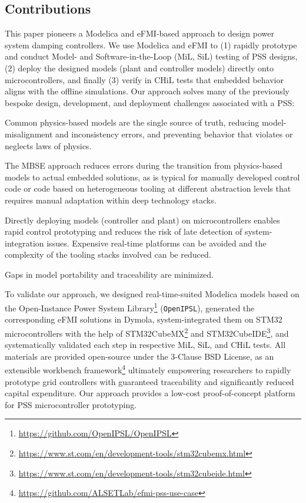 \subsection{Contributions}

This paper pioneers a Modelica and eFMI-based approach to design power system damping controllers. We use Modelica and eFMI to (1) rapidly prototype and conduct Model- and Software-in-the-Loop (MiL, SiL) testing of PSS designs, (2) deploy the designed models (plant and controller models) directly onto microcontrollers, and finally (3) verify in CHiL tests that embedded behavior aligns with the offline simulations. Our approach solves many of the previously bespoke design, development, and deployment challenges associated with a PSS:

\squishlist
    \item Common physics-based models are the single source of truth, reducing model-misalignment and inconsistency errors, and preventing behavior that violates or neglects laws of physics.
    \item The MBSE approach reduces errors during the transition from physics-based models to actual embedded solutions, as is typical for manually developed control code or code based on heterogeneous tooling at different abstraction levels that requires manual adaptation within deep technology stacks.
    \item Directly deploying models (controller and plant) on microcontrollers enables rapid control prototyping and reduces the risk of late detection of system-integration issues. Expensive real-time platforms can be avoided and the complexity of the tooling stacks involved can be reduced.
    \item Gaps in model portability and traceability are minimized.
\squishend

\noindent{}To validate our approach, we designed real-time-suited Modelica models based on the Open-Instance Power System Library\footnote{\label{fnt:openipsl}\tiny{\url{https://github.com/OpenIPSL/OpenIPSL}}} (\texttt{OpenIPSL}), generated the corresponding eFMI solutions in Dymola, system-integrated them on STM32\regtm{} microcontrollers with the help of STM32CubeMX\footnote{\label{fnt:stm32cubemx}\tiny{\url{https://www.st.com/en/development-tools/stm32cubemx.html}}} and STM32CubeIDE\footnote{\label{fnt:stm32cubeide}\tiny{\url{https://www.st.com/en/development-tools/stm32cubeide.html}}}, and systematically validated each step in respective MiL, SiL, and CHiL tests. All materials are provided open-source under the 3-Clause BSD License, as an extensible workbench framework\footnote{\label{fnt:pss-repository}\tiny{\url{https://github.com/ALSETLab/efmi-pss-use-case}}} ultimately empowering researchers to rapidly prototype grid controllers with guaranteed traceability and significantly reduced capital expenditure. Our approach provides a low-cost proof-of-concept platform for PSS microcontroller prototyping.

